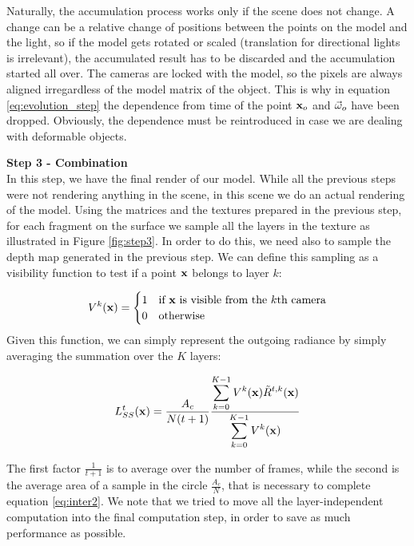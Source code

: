 Naturally, the accumulation process works only if the scene does not change. A change can be a relative change of positions between the points on the model and the light, so if the model gets rotated or scaled (translation for directional lights is irrelevant), the accumulated result has to be discarded and the accumulation started all over. The cameras are locked with the model, so the pixels are always aligned irregardless of the model matrix of the object. This is why in equation \ref{eq:evolution_step} the dependence from time of the point $\mathbf{x}_o$ and $\vec{\omega}_o$ have been dropped. Obviously, the dependence must be reintroduced in case we are dealing with deformable objects.
 
\textbf{Step 3 - Combination} \\
In this step, we have the final render of our model. While all the previous steps were not rendering anything in the scene, in this scene we do an actual rendering of the model. Using the matrices and the textures prepared in the previous step, for each fragment on the surface we sample all the layers in the texture as illustrated in Figure \ref{fig:step3}. In order to do this, we need also to sample the depth map generated in the previous step. We can define this sampling as a visibility function to test if a point $\mathbf{x}$ belongs to layer $k$:

$$
V^k(\mathbf{x}) = \begin{cases}
1 & \text{if $\mathbf{x}$ is visible from the $k$th camera} \\
0 & \text{otherwise}
\end{cases}
$$
Given this function, we can simply represent the outgoing radiance by simply averaging the summation over the $K$ layers:

$$
L_{SS}^t(\mathbf{x}) = \frac{A_c}{N (t + 1)} \frac{\displaystyle\sum_{k = 0}^{K-1}V^k(\mathbf{x}) \tilde{R}^{t,k}(\mathbf{x})}{\displaystyle\sum_{k = 0}^{K-1}V^k(\mathbf{x})}
$$

The first factor $\frac{1}{t + 1}$ is to average over the number of frames, while the second is the average area of a sample in the circle $\frac{A_c}{N}$, that is necessary to complete equation \ref{eq:inter2}. We note that we tried to move all the layer-independent computation into the final computation step, in order to save as much performance as possible. 

